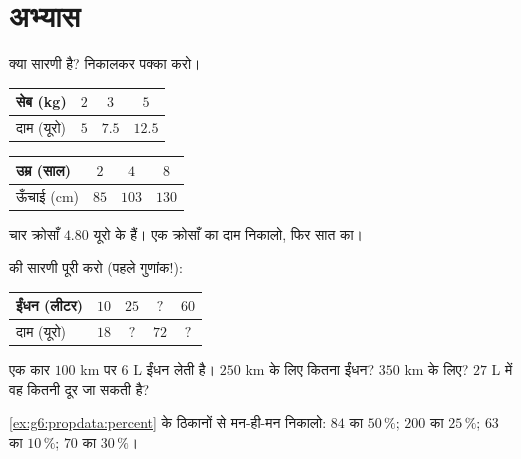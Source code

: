 \section{अभ्यास}

\begin{exercise}[$\star$]\label{exo:g6:propdata:1}
क्या सारणी  है?  निकालकर पक्का करो।
\begin{center}
\renewcommand{\arraystretch}{1.2}
\begin{tabular}{l|ccc}
सेब (kg) & $2$ & $3$ & $5$ \\
\hline
दाम (यूरो) & $5$ & $7.5$ & $12.5$ \\
\end{tabular}
\qquad
\begin{tabular}{l|ccc}
उम्र (साल) & $2$ & $4$ & $8$ \\
\hline
ऊँचाई (cm) & $85$ & $103$ & $130$ \\
\end{tabular}
\end{center}
\end{exercise}

\begin{exercise}[$\star$]\label{exo:g6:propdata:2}
चार क्रोसाँ $4.80$ यूरो के हैं। एक क्रोसाँ का दाम निकालो,
फिर सात का।
\end{exercise}

\begin{exercise}[$\star$]\label{exo:g6:propdata:3}
 की सारणी पूरी करो (पहले गुणांक!):
\begin{center}
\renewcommand{\arraystretch}{1.2}
\begin{tabular}{l|cccc}
ईंधन (लीटर) & $10$ & $25$ & $?$ & $60$ \\
\hline
दाम (यूरो) & $18$ & $?$ & $72$ & $?$ \\
\end{tabular}
\end{center}
\end{exercise}

\begin{exercise}[$\star$]\label{exo:g6:propdata:4}
एक कार $100$ km पर $6$ L ईंधन लेती है। $250$ km के लिए कितना
ईंधन? $350$ km के लिए? $27$ L में वह कितनी दूर जा सकती है?
\end{exercise}

\begin{exercise}[$\star$]\label{exo:g6:propdata:5}
\cref{ex:g6:propdata:percent} के ठिकानों से मन-ही-मन निकालो:
$84$ का $50\,\%$; \quad $200$ का $25\,\%$; \quad $63$ का $10\,\%$;
\quad $70$ का $30\,\%$।
\end{exercise}

